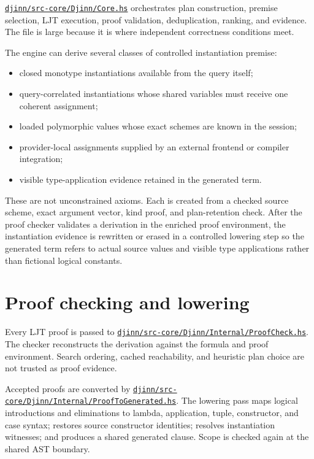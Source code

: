 \documentclass[10pt,letterpaper,oneside]{report}
\def\DjexBase{https://github.com/VladimirReshetnikov/Djex/blob/d3d9662598460316bdcd177ce6768c521e764aa8/}
\newcommand{\dpath}[1]{\href{\DjexBase#1}{\nolinkurl{#1}}}
\begin{document}
\dpath{djinn/src-core/Djinn/Core.hs} orchestrates plan construction, premise selection, LJT execution, proof validation, deduplication, ranking, and evidence. The file is large because it is where independent correctness conditions meet.

The engine can derive several classes of controlled instantiation premise:

\begin{itemize}
  \item closed monotype instantiations available from the query itself;
  \item query-correlated instantiations whose shared variables must receive one coherent assignment;
  \item loaded polymorphic values whose exact schemes are known in the session;
  \item provider-local assignments supplied by an external frontend or compiler integration;
  \item visible type-application evidence retained in the generated term.
\end{itemize}

These are not unconstrained axioms. Each is created from a checked source scheme, exact argument vector, kind proof, and plan-retention check. After the proof checker validates a derivation in the enriched proof environment, the instantiation evidence is rewritten or erased in a controlled lowering step so the generated term refers to actual source values and visible type applications rather than fictional logical constants.

\section{Proof checking and lowering}

Every LJT proof is passed to \dpath{djinn/src-core/Djinn/Internal/ProofCheck.hs}. The checker reconstructs the derivation against the formula and proof environment. Search ordering, cached reachability, and heuristic plan choice are not trusted as proof evidence.

Accepted proofs are converted by \dpath{djinn/src-core/Djinn/Internal/ProofToGenerated.hs}. The lowering pass maps logical introductions and eliminations to lambda, application, tuple, constructor, and case syntax; restores source constructor identities; resolves instantiation witnesses; and produces a shared generated clause. Scope is checked again at the shared AST boundary.
\end{document}
